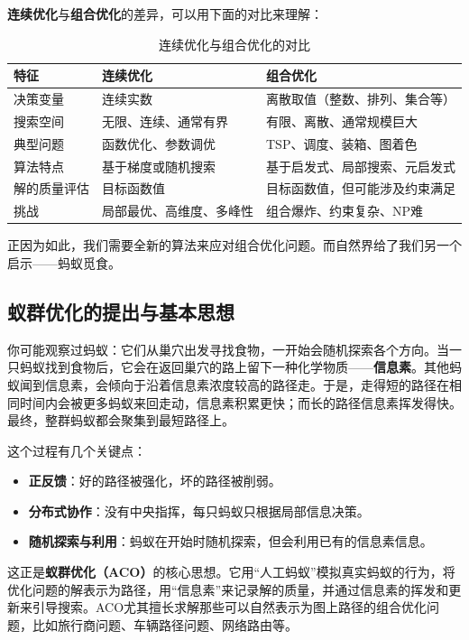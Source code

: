 \documentclass[lang=cn,zihao=-4,a4paper,fontset=windows]{beautybook}
\begin{document}
\textbf{连续优化}与\textbf{组合优化}的差异，可以用下面的对比来理解：

\begin{table}[H]
\centering
\caption{连续优化与组合优化的对比}
\begin{tabular}{p{}p{}p{}}
\toprule
\textbf{特征} & \textbf{连续优化} & \textbf{组合优化} \\
\midrule
决策变量 & 连续实数 & 离散取值（整数、排列、集合等） \\
\hline
搜索空间 & 无限、连续、通常有界 & 有限、离散、通常规模巨大 \\
\hline
典型问题 & 函数优化、参数调优 & TSP、调度、装箱、图着色 \\
\hline
算法特点 & 基于梯度或随机搜索 & 基于启发式、局部搜索、元启发式 \\
\hline
解的质量评估 & 目标函数值 & 目标函数值，但可能涉及约束满足 \\
\hline
挑战 & 局部最优、高维度、多峰性 & 组合爆炸、约束复杂、NP难 \\
\bottomrule
\end{tabular}
\end{table}

正因为如此，我们需要全新的算法来应对组合优化问题。而自然界给了我们另一个启示——蚂蚁觅食。

\subsection{蚁群优化的提出与基本思想}

你可能观察过蚂蚁：它们从巢穴出发寻找食物，一开始会随机探索各个方向。当一只蚂蚁找到食物后，它会在返回巢穴的路上留下一种化学物质——\textbf{信息素}。其他蚂蚁闻到信息素，会倾向于沿着信息素浓度较高的路径走。于是，走得短的路径在相同时间内会被更多蚂蚁来回走动，信息素积累更快；而长的路径信息素挥发得快。最终，整群蚂蚁都会聚集到最短路径上。

这个过程有几个关键点：
\begin{itemize}
    \item \textbf{正反馈}：好的路径被强化，坏的路径被削弱。
    \item \textbf{分布式协作}：没有中央指挥，每只蚂蚁只根据局部信息决策。
    \item \textbf{随机探索与利用}：蚂蚁在开始时随机探索，但会利用已有的信息素信息。
\end{itemize}

这正是\textbf{蚁群优化（ACO）}的核心思想。它用“人工蚂蚁”模拟真实蚂蚁的行为，将优化问题的解表示为路径，用“信息素”来记录解的质量，并通过信息素的挥发和更新来引导搜索。ACO尤其擅长求解那些可以自然表示为图上路径的组合优化问题，比如旅行商问题、车辆路径问题、网络路由等。
\end{document}
